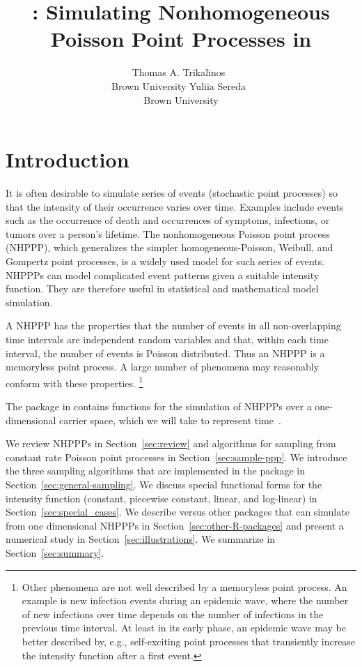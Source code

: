 \documentclass[article]{jss}\usepackage[]{graphicx}\usepackage[]{xcolor}
\author{Thomas A. Trikalinos~\orcidlink{0000-0002-3990-1848}\\Brown University
   \And Yuliia Sereda~\orcidlink{https://orcid.org/0000-0002-4017-4561}\\Brown University}
\title{\pkg{nhppp}: Simulating Nonhomogeneous Poisson Point Processes in \proglang{R}}
\begin{document}



\section{Introduction} \label{sec:intro}

It is often desirable to simulate series of events (stochastic point processes) so that the intensity of their occurrence varies over time. Examples include events such as the occurrence of death and occurrences of symptoms, infections, or tumors over a person's lifetime. The nonhomogeneous Poisson point process (NHPPP), which generalizes the simpler homogeneous-Poisson, Weibull, and Gompertz point processes, is a widely used model for such series of events. NHPPPs can model complicated event patterns given a suitable intensity function. They are therefore useful in statistical and mathematical model simulation.

A NHPPP has the properties that the number of events in all non-overlapping time intervals are independent random variables and that, within each time interval, the number of events is Poisson distributed. Thus an NHPPP is a memoryless point process. A large number of phenomena may reasonably conform with these properties.%
\footnote{Other phenomena are not well described by a memoryless point process. An example is new infection events during an epidemic wave, where the number of new infections over time depends on the number of infections in the previous time interval. At least in its early phase, an epidemic wave may be better described by, e.g., self-exciting point processes that transiently increase the intensity function after a first event.}

The  package in  contains functions for the simulation of NHPPPs over a one-dimensional carrier space, which we will take to represent time~\citep{nhppp-package, trikalinos2024nhppp}.

We review NHPPPs in Section~\ref{sec:review} and algorithms for sampling from constant rate Poisson point processes in Section~\ref{sec:sample-ppp}. We introduce the three sampling algorithms that are implemented in the package in Section~\ref{sec:general-sampling}. We discuss special functional forms for the intensity function (constant, piecewise constant, linear, and log-linear) in Section~\ref{sec:special_cases}. We describe  versus other  packages that can simulate from one dimensional NHPPPs in Section~\ref{sec:other-R-packages} and present a numerical study in Section~\ref{sec:illustrations}. We summarize in Section~\ref{sec:summary}.
\end{document}
